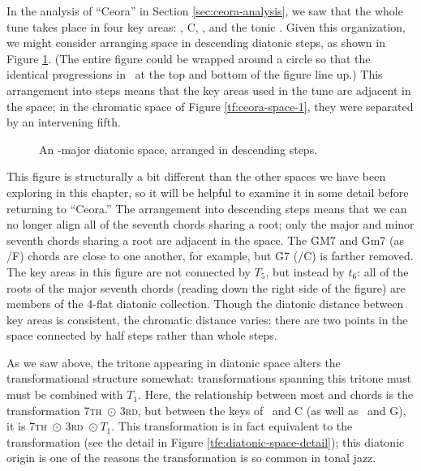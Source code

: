 In the analysis of ``Ceora'' in Section \ref{sec:ceora-analysis}, we saw that
the whole tune takes place in four key areas: \Dflat, C, \Bflat, and the tonic
\Aflat. Given this organization, we might consider arranging \tf space in
descending diatonic steps, as shown in Figure \ref{tfe:ab-diatonic-space}.
(The entire figure could be wrapped around a circle so that the identical \tfo
progressions in \Aflat\ at the top and bottom of the figure line up.) This
arrangement into steps means that the key areas used in the tune are adjacent
in the space; in the chromatic space of Figure \ref{tf:ceora-space-1}, they
were separated by an intervening fifth.

\begin{figure}[tbp]
  \caption{An \Aflat{}-major diatonic \tf space, arranged in descending steps.}
  \label{tfe:ab-diatonic-space}
\end{figure}

This figure is structurally a bit different than the other spaces we have been
exploring in this chapter, so it will be helpful to examine it in some detail
before returning to ``Ceora.'' The arrangement into descending steps means
that we can no longer align all of the seventh chords sharing a root; only the
major and minor seventh chords sharing a root are adjacent in the
space. The \h{GM7} and \h{Gm7} (as \ii/F) chords are close to
one another, for example, but \h{G7} (\V/C) is farther removed. The key
areas in this figure are not connected by $T_5$, but instead by $t_6$: all of
the roots of the major seventh chords (reading down the right side of the
figure) are members of the 4-flat diatonic collection. Though the
diatonic distance between key areas is consistent, the chromatic distance
varies: there are two points in the space connected by half steps rather than
whole steps.

As we saw above, the tritone appearing in diatonic space alters the
transformational structure somewhat: transformations spanning this tritone
must must be combined with $T_1$. Here, the relationship between most
\I and \ii chords is the transformation \textsc{7th}~$\odot$
\textsc{3rd}, but between the keys of \Dflat\ and C (as well as \Aflat\ and
G), it is \textsc{7th}~$\odot$ \textsc{3rd}~$\odot\ T_1$. This transformation
is in fact equivalent to the transformation \slideS (see the detail in Figure
\ref{tfe:diatonic-space-detail}); this diatonic origin is one of the reasons
the \slideS transformation is so common in tonal jazz.

